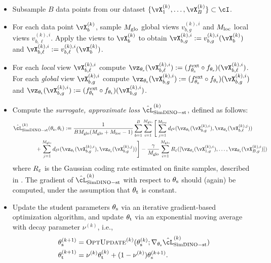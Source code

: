 \documentclass[../../book-main.tex]{subfiles}
\begin{document}
\begin{itemize}
    \item Subsample \(B\) data points from our dataset \(\{\vX_{1}^{(k)}, \dots, \vX_{B}^{(k)}\} \subset \cI\).
    \item For each data point \(\vX_{b}^{(k)}\), sample \(M_{\mathrm{glo}}\) global views \(v_{b, g}^{(k), i}\) and \(M_{\mathrm{loc}}\) local views \(v_{b, \ell}^{(k), i}\). Apply the views to \(\vX_{b}^{(k)}\) to obtain \(\vX_{b, g}^{(k), i} := v_{b, g}^{(k), i}(\vX_{b}^{(k)})\) and \(\vX_{b, \ell}^{(k), i} := v_{b, \ell}^{(k), i}(\vX_{b}^{(k)})\).
    \item For each \textit{local} view \(\vX_{b, \ell}^{(k), i}\) compute \(\vz_{\theta_{\student}}(\vX_{b, \ell}^{(k), i}) := (f_{\theta_{\student}}^{\ext} \circ f_{\theta_{\student}})(\vX_{b, \ell}^{(k), i})\). For each \textit{global} view \(\vX_{b, g}^{(k), i}\) compute \(\vz_{\theta_{\student}}(\vX_{b, g}^{(k), i}) := (f_{\theta_{\student}}^{\ext} \circ f_{\theta_{\student}})(\vX_{b, g}^{(k), i})\) and \(\vz_{\theta_{\teacher}}(\vX_{b, g}^{(k), i}) := (f_{\theta_{\teacher}}^{\ext} \circ f_{\theta_{\teacher}})(\vX_{b, g}^{(k), i})\).
    \item Compute the \textit{surrogate, approximate loss} \(\hat{\cL}_{\simdino-\student\teacher}^{(k)}\), defined as follows: 
    \begin{align}\label{eq:simdino_loss_teacherstudent_empirical}
        &\hat{\cL}_{\simdino{}-\student\teacher}^{(k)}(\theta_{\student}, \theta_{\teacher}) :=
        \frac{1}{BM_{\glo}(M_{\glo} + M_{\loc} - 1)}\sum_{b = 1}^{B}\sum_{i = 1}^{M_{\glo}}\Bigg[\sum_{j = 1}^{M_{\loc}}d_{\ell^{2}}(\vz_{\theta_{\teacher}}(\vX_{b, g}^{(k), i}), \vz_{\theta_{\student}}(\vX_{b, \ell}^{(k), j})) \\ 
        &\qquad \qquad + \sum_{j = 1}^{M_{\glo}}d_{\ell^{2}}(\vz_{\theta_{\teacher}}(\vX_{b, g}^{(k), i}), \vz_{\theta_{\student}}(\vX_{b, g}^{(k), j}))\Bigg] - \frac{\gamma}{M_{\glo}}\sum_{i = 1}^{M_{\glo}}R_{\eps}([\vz_{\theta_{\student}}(\vX_{1, g}^{(k), i}), \dots, \vz_{\theta_{\student}}(\vX_{B, g}^{(k), i})])\nonumber
    \end{align}
    where \(R_{\varepsilon}\) is the Gaussian coding rate estimated on finite samples, described in . The gradient of \(\hat{\cL}_{\simdino-\student\teacher}^{(k)}\) with respect to \(\theta_{\mathrm{s}}\) should (again) be computed, under the assumption that \(\theta_{\mathrm{t}}\) is constant.
    \item Update the student parameters \(\theta_{\mathrm{s}}\) via an iterative gradient-based optimization algorithm, and update \(\theta_{\mathrm{t}}\) via an exponential moving average with decay parameter \(\nu^{(k)}\), i.e., 
    \begin{align}
        \theta_{\student}^{(k + 1)}
        &= \textsc{OptUpdate}^{(k)}(\theta_{\student}^{(k)}; \nabla_{\theta_{\student}}\hat{\cL}_{\simdino-\student\teacher}^{(k)}) \\
        \theta_{\teacher}^{(k + 1)}
        &= \nu^{(k)}\theta_{\teacher}^{(k)} + (1 - \nu^{(k)})\theta_{\student}^{(k + 1)}.
    \end{align}
\end{itemize}
\end{document}
